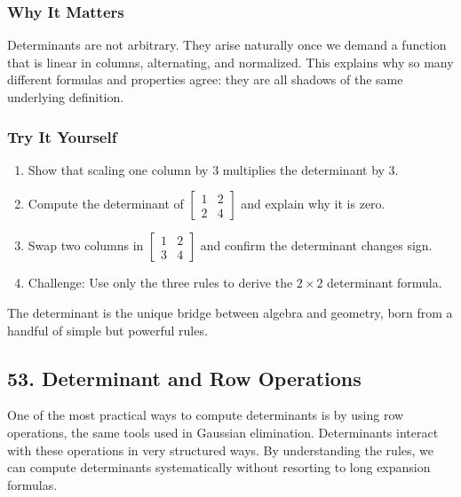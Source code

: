 \documentclass[
  letterpaper,
  DIV=11,
  numbers=noendperiod]{scrreprt}
\providecommand{\tightlist}{%
  \setlength{\itemsep}{0pt}\setlength{\parskip}{0pt}}
\begin{document}
\subsubsection{Why It Matters}\label{why-it-matters-48}

Determinants are not arbitrary. They arise naturally once we demand a
function that is linear in columns, alternating, and normalized. This
explains why so many different formulas and properties agree: they are
all shadows of the same underlying definition.

\subsubsection{Try It Yourself}\label{try-it-yourself-51}

\begin{enumerate}
\def\labelenumi{\arabic{enumi}.}
\tightlist
\item
  Show that scaling one column by 3 multiplies the determinant by 3.
\item
  Compute the determinant of
  \(\begin{bmatrix} 1 & 2 \\ 2 & 4 \end{bmatrix}\) and explain why it is
  zero.
\item
  Swap two columns in \(\begin{bmatrix} 1 & 2 \\ 3 & 4 \end{bmatrix}\)
  and confirm the determinant changes sign.
\item
  Challenge: Use only the three rules to derive the \(2 \times 2\)
  determinant formula.
\end{enumerate}

The determinant is the unique bridge between algebra and geometry, born
from a handful of simple but powerful rules.

\subsection{53. Determinant and Row
Operations}\label{determinant-and-row-operations}

One of the most practical ways to compute determinants is by using row
operations, the same tools used in Gaussian elimination. Determinants
interact with these operations in very structured ways. By understanding
the rules, we can compute determinants systematically without resorting
to long expansion formulas.
\end{document}
